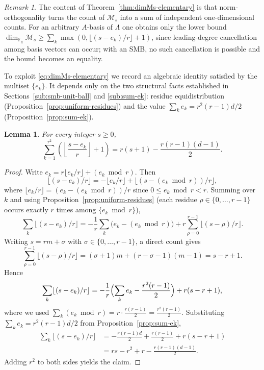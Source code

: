 \documentclass[12pt]{amsart}
\newtheorem{lem}[thm]{Lemma}
\theoremstyle{definition}
\theoremstyle{remark}
\newtheorem{rem}[thm]{Remark}
\numberwithin{equation}{section}
\numberwithin{thm}{section}
\newcommand{\cM}{\mathcal{M}}
\newcommand{\F}{\mathbb{F}}
\newcommand{\La}{\Lambda}
\begin{document}
	\begin{rem}
		The content of Theorem~\ref{thm:dimMs-elementary} is that norm-orthogonality turns the count of $\cM_s$ into a sum of independent one-dimensional counts. For an arbitrary $A$-basis of $\La$ one obtains only the lower bound $\dim_{\F_q}\cM_s \geq \sum_k \max(0, \lfloor(s-e_k)/r\rfloor + 1)$, since leading-degree cancellation among basis vectors can occur; with an SMB, no such cancellation is possible and the bound becomes an equality.
	\end{rem}
	
	To exploit \eqref{eq:dimMs-elementary} we record an algebraic identity satisfied by the multiset $\{e_k\}$. It depends only on the two structural facts established in Sections~\ref{sub:smb-unit-ball} and \ref{sub:sum-ek}: residue equidistribution (Proposition~\ref{prop:uniform-residues}) and the value $\sum_k e_k = r^2(r-1)d/2$ (Proposition~\ref{prop:sum-ek}).
	
	\begin{lem}\label{lem:floor-identity}
		For every integer $s \geq 0$,
		\[
		\sum_{k=1}^{r^2}\left(\left\lfloor\frac{s-e_k}{r}\right\rfloor + 1\right) = r(s+1) - \frac{r(r-1)(d-1)}{2}.
		\]
	\end{lem}
	
	\begin{proof}
		Write $e_k = r\lfloor e_k/r\rfloor + (e_k \bmod r)$. Then
		\[
		\lfloor(s-e_k)/r\rfloor = -\lfloor e_k/r\rfloor + \lfloor(s - (e_k \bmod r))/r\rfloor,
		\]
		where $\lfloor e_k/r\rfloor = (e_k - (e_k \bmod r))/r$ since $0 \leq e_k \bmod r < r$. Summing over $k$ and using Proposition~\ref{prop:uniform-residues} (each residue $\rho \in \{0, \ldots, r-1\}$ occurs exactly $r$ times among $\{e_k \bmod r\}$),
		\[
		\sum_k \lfloor(s-e_k)/r\rfloor = -\frac{1}{r}\sum_k\bigl(e_k - (e_k \bmod r)\bigr) + r\sum_{\rho=0}^{r-1}\lfloor(s-\rho)/r\rfloor.
		\]
		Writing $s = rm + \sigma$ with $\sigma \in \{0, \ldots, r-1\}$, a direct count gives \[\sum_{\rho=0}^{r-1}\lfloor(s-\rho)/r\rfloor = (\sigma+1)m + (r-\sigma-1)(m-1) = s - r + 1.\] Hence
		\[
		\sum_k \lfloor(s-e_k)/r\rfloor = -\frac{1}{r}\Bigl(\sum_k e_k - \frac{r^2(r-1)}{2}\Bigr) + r(s-r+1),
		\]
		where we used $\sum_k(e_k \bmod r) = r\cdot\frac{r(r-1)}{2} = \frac{r^2(r-1)}{2}$. Substituting $\sum_k e_k = r^2(r-1)d/2$ from Proposition~\ref{prop:sum-ek},
		\begin{align*}
			\sum_k \lfloor(s-e_k)/r\rfloor &= -\frac{r(r-1)d}{2} + \frac{r(r-1)}{2} + r(s-r+1) \\
			&= rs - r^2 + r - \frac{r(r-1)(d-1)}{2}.
		\end{align*}
		Adding $r^2$ to both sides yields the claim.
	\end{proof}
	
\end{document}
